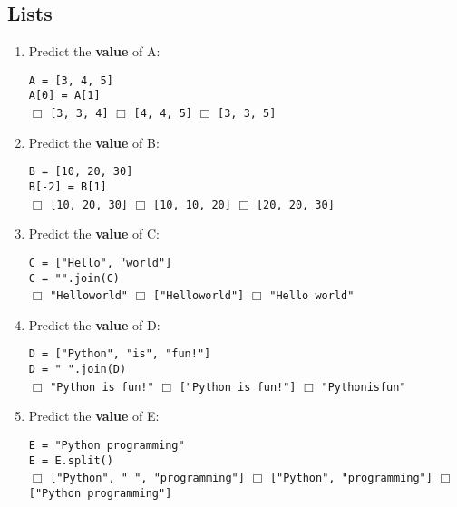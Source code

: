 \documentclass[11pt]{report}
\begin{document}
\subsection*{Lists}
\begin{enumerate}


    \item Predict the \textbf{value} of A:

    {\tt A = [3, 4, 5]}\\
    {\tt A[0] = A[1]}\\
    $\Box$ {\tt [3, 3, 4]} \hspace{3em} $\Box$ {\tt [4, 4, 5]} \hspace{3em} $\Box$ {\tt [3, 3, 5]}

    \item Predict the \textbf{value} of B:

    {\tt B = [10, 20, 30]}\\
    {\tt B[-2] = B[1]}\\
    $\Box$ {\tt [10, 20, 30]} \hspace{3em} $\Box$ {\tt [10, 10, 20]} \hspace{3em} $\Box$ {\tt [20, 20, 30]}

    \item Predict the \textbf{value} of C:

    {\tt C = ["Hello", "world"]}\\
    {\tt C = "".join(C)}\\
    $\Box$ {\tt "Helloworld"} \hspace{3em} $\Box$ {\tt ["Helloworld"]} \hspace{3em} $\Box$ {\tt "Hello world"}

    \item Predict the \textbf{value} of D:

    {\tt D = ["Python", "is", "fun!"]}\\
    {\tt D = " ".join(D)}\\
    $\Box$ {\tt "Python is fun!"} \hspace{3em} $\Box$ {\tt ["Python is fun!"]} \hspace{3em} $\Box$ {\tt "Pythonisfun"}

    \item Predict the \textbf{value} of E:

    {\tt E = "Python programming"}\\
    {\tt E = E.split()}\\
    $\Box$ {\tt ["Python", " ", "programming"]} \hspace{0.5em} $\Box$ {\tt ["Python", "programming"]} \hspace{0.5em} $\Box$ {\tt ["Python programming"]}


\end{enumerate}
\end{document}
